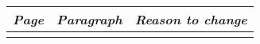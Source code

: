 \begin{longtable}{|l|l|p{11cm}|}
    \hline
    \emph{Page} &   \emph{Paragraph}    &   \emph{Reason to change}\\
    \hline
    \endhead
    \hline
    \endfoot

\end{longtable}
